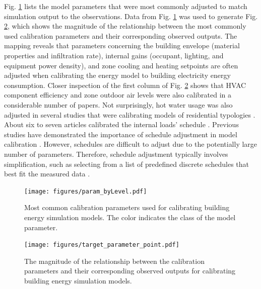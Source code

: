 \documentclass[review]{elsarticle}
\begin{document}
Fig. \ref{fig:param} lists the model parameters that were most commonly adjusted to match simulation output to the observations. Data from Fig. \ref{fig:param} was used to generate Fig. \ref{fig:target_param}, which shows the magnitude of the relationship between the most commonly used calibration parameters and their corresponding observed outputs. The mapping reveals that parameters concerning the building envelope (material properties and infiltration rate), internal gains (occupant, lighting, and equipment power density), and zone cooling and heating setpoints are often adjusted when calibrating the energy model to building electricity energy consumption. Closer inspection of the first column of Fig. \ref{fig:target_param} shows that HVAC component efficiency and zone outdoor air levels were also calibrated in a considerable number of papers. Not surprisingly, hot water usage was also adjusted in several studies that were calibrating models of residential typologies \cite{nagpal2019methodology, sokol2017validation, robertson2015reduced, manfren2020parametric}. About six to seven articles calibrated the internal loads' schedule \cite{nagpal2019methodology, kim2017building, sun2016pattern, nagpal2019framework, asadi2019building, chen2020automatic, krayem2019urban}. Previous studies have demonstrated the importance of schedule adjustment in model calibration \cite{kim2017building, chong2021occupancy}. However, schedules are difficult to adjust due to the potentially large number of parameters. Therefore, schedule adjustment typically involves simplification, such as selecting from a list of predefined discrete schedules that best fit the measured data \cite{nagpal2019methodology, nagpal2019framework, krayem2019urban, chen2020automatic}. 

\begin{figure}[!h]
\centering
\texttt{[image: figures/param\_byLevel.pdf]}
\caption{Most common calibration parameters used for calibrating building energy simulation models. The color indicates the class of the model parameter.}
\label{fig:param}
\end{figure}

\begin{figure}[!h]
\centering
\texttt{[image: figures/target\_parameter\_point.pdf]}
\caption{The magnitude of the relationship between the calibration parameters and their corresponding observed outputs for calibrating building energy simulation models.}
\label{fig:target_param}
\end{figure}
\end{document}
